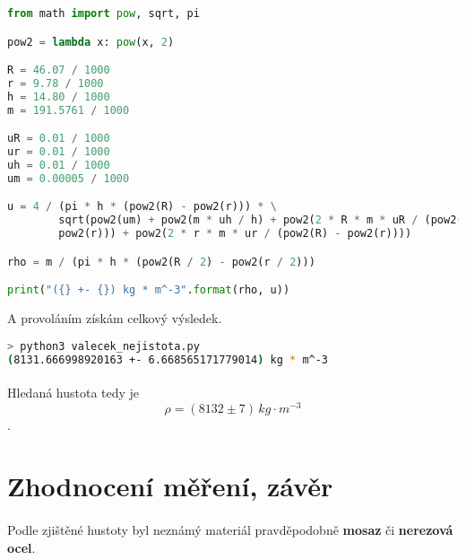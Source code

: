 \documentclass[a4paper,11pt]{article}
\begin{document}
    \begin{lstlisting}[language=Python]
from math import pow, sqrt, pi

pow2 = lambda x: pow(x, 2)

R = 46.07 / 1000
r = 9.78 / 1000
h = 14.80 / 1000
m = 191.5761 / 1000

uR = 0.01 / 1000
ur = 0.01 / 1000
uh = 0.01 / 1000
um = 0.00005 / 1000

u = 4 / (pi * h * (pow2(R) - pow2(r))) * \
        sqrt(pow2(um) + pow2(m * uh / h) + pow2(2 * R * m * uR / (pow2(R) - \
        pow2(r))) + pow2(2 * r * m * ur / (pow2(R) - pow2(r))))

rho = m / (pi * h * (pow2(R / 2) - pow2(r / 2)))

print("({} +- {}) kg * m^-3".format(rho, u)) \end{lstlisting}

    A provoláním získám celkový výsledek.

    \begin{lstlisting}[language=Bash]
> python3 valecek_nejistota.py
(8131.666998920163 +- 6.668565171779014) kg * m^-3 \end{lstlisting}

    \paragraph{} Hledaná hustota tedy je
    $$\rho = \left(8132 \pm 7 \right)\,kg \cdot m^{-3}$$.

\section{Zhodnocení měření, závěr}

    \paragraph{} Podle zjištěné hustoty byl neznámý materiál 
    pravděpodobně \textbf{mosaz} či \textbf{nerezová ocel}.
\end{document}
